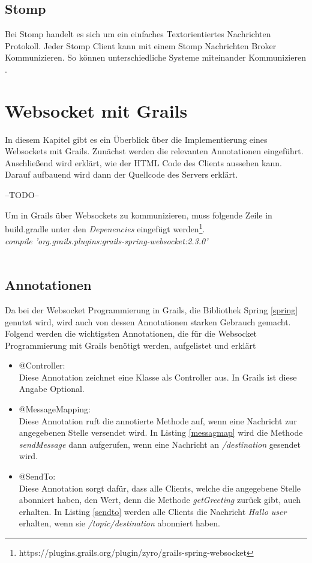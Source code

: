\subsection{Stomp}

Bei Stomp handelt es sich um ein einfaches Textorientiertes Nachrichten Protokoll. Jeder Stomp Client kann mit einem Stomp Nachrichten Broker Kommunizieren. So können unterschiedliche Systeme miteinander Kommunizieren \cite{stomp}.

\section{Websocket mit Grails}

In diesem Kapitel gibt es ein Überblick über die Implementierung eines Websockets mit Grails. Zunächst werden die relevanten Annotationen eingeführt. Anschließend wird erklärt, wie der HTML Code des Clients aussehen kann. Darauf aufbauend wird dann der Quellcode des Servers erklärt. 

--TODO--

Um in Grails über Websockets zu kommunizieren, muss folgende Zeile in build.gradle unter den \textit{Depenencies} eingefügt werden\footnote{https://plugins.grails.org/plugin/zyro/grails-spring-websocket}.\\
\textit{compile 'org.grails.plugins:grails-spring-websocket:2.3.0'}\\
\\

\subsection{Annotationen}\label{ankapitel}

Da bei der Websocket Programmierung in Grails, die Bibliothek Spring \ref{spring} genutzt wird, wird auch von dessen Annotationen starken Gebrauch gemacht. Folgend werden die wichtigsten Annotationen, die für die Websocket Programmierung mit Grails benötigt werden, aufgelistet und erklärt \cite{spring2017}

\begin{itemize}
	\item @Controller:\\	
	Diese Annotation zeichnet eine Klasse als Controller aus. In Grails ist diese Angabe Optional.
	
	\item @MessageMapping:\\
	Diese Annotation ruft die annotierte Methode auf, wenn eine Nachricht zur angegebenen Stelle versendet wird. In Listing \ref{messagmap} wird die Methode \textit{sendMessage} dann aufgerufen, wenn eine Nachricht an \textit{/destination} gesendet wird. 
	   
	\item @SendTo:\\
	Diese Annotation sorgt dafür, dass alle Clients, welche die angegebene Stelle 	abonniert haben, den Wert, denn die Methode \textit{getGreeting} zurück gibt, auch erhalten. In Listing \ref{sendto} werden alle Clients die Nachricht \textit{Hallo user} erhalten, wenn sie \textit{/topic/destination} abonniert haben. 
    
    
\end{itemize} 

